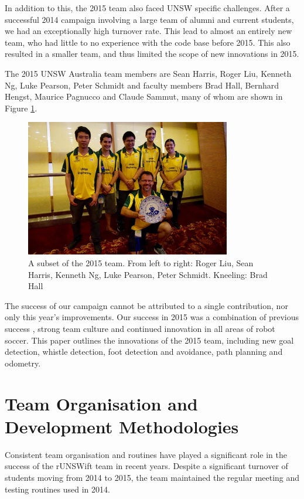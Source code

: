 \documentclass[runningheads,a4paper]{llncs}
\begin{document}
In addition to this, the 2015 team also faced UNSW specific challenges. After a successful 2014 campaign involving a large team of alumni and current students, we had an exceptionally high turnover rate. This lead to almost an entirely new team, who had little to no experience with the code base before 2015. This also resulted in a smaller team, and thus limited the scope of new innovations in 2015.

The 2015 UNSW Australia team members are Sean Harris, Roger Liu, Kenneth Ng, Luke Pearson, Peter Schmidt and faculty members Brad Hall, Bernhard Hengst, Maurice Pagnucco and Claude Sammut, many of whom are shown in Figure \ref{teamphoto}.

\begin{figure}[h]
\centering
\includegraphics[width=0.8\textwidth]{Figures/TeamPhoto.jpg}
\caption{A subset of the 2015 team. From left to right: Roger Liu, Sean Harris, Kenneth Ng, Luke Pearson, Peter Schmidt. Kneeling: Brad Hall}
\label{teamphoto}
\end{figure}

The success of our campaign cannot be attributed to a single contribution, nor only this year's improvements. Our success in 2015 was a combination of previous success \cite{2014runswift}, strong team culture and continued innovation in all areas of robot soccer. This paper outlines the innovations of the 2015 team, including new goal detection, whistle detection, foot detection and avoidance, path planning and odometry.


\section{Team Organisation and Development Methodologies}
Consistent team organisation and routines have played a significant role in the success of the rUNSWift team in recent years. Despite a significant turnover of students moving from 2014 to 2015, the team maintained the regular meeting and testing routines used in 2014.
\end{document}

